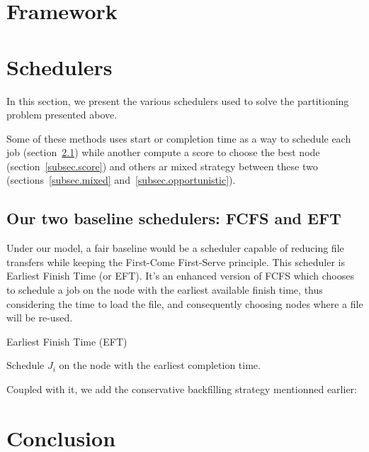 \documentclass[conference,10pt]{IEEEtran}
\begin{document}

\section{Framework}\label{sec.framework}

\section{Schedulers}\label{sec.schedulers}

In this section, we present the various schedulers used to solve
the partitioning problem presented above. 

Some of these methods uses start or completion time as a way to
schedule each job (section~\ref{subsec.fcfs_eft}) while another compute 
a score to choose the best node (section~\ref{subsec.score}) and others
ar mixed strategy between these two (sections~\ref{subsec.mixed} and~\ref{subsec.opportunistic}).

\subsection{Our two baseline schedulers: FCFS and EFT}\label{subsec.fcfs_eft}

Under our model, a fair baseline would be a scheduler capable
of reducing file transfers while keeping the First-Come First-Serve 
principle. This scheduler is Earliest Finish Time (or EFT).
It's an enhanced version of FCFS which chooses to schedule a job
on the node with the earliest available finish time, thus considering
the time to load the file, and consequently choosing nodes where a file will
be re-used. 

\begin{algorithm}[htbp]
	\caption{Earliest Finish Time (EFT)}\label{algo.eft}
	\begin{algorithmic}[1]
			\State Schedule $J_i$ on the node with the earliest completion time.
		\EndFor
	\end{algorithmic}
\end{algorithm}

Coupled with it, we add the conservative backfilling strategy mentionned earlier:

\section{Conclusion}\label{sec.conclusion}

\end{document}
